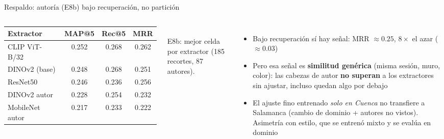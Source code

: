 \begin{frame}{Respaldo: autoría (E8b) bajo recuperación, no partición}
  \begin{columns}[c]
      \centering \scriptsize
      \setlength{\tabcolsep}{4pt}
      \begin{tabular}{lccc}
        \toprule
        \textbf{Extractor} & \textbf{MAP@5} & \textbf{Rec@5} & \textbf{MRR} \\
        \midrule
        CLIP ViT-B/32        & 0.252 & 0.268 & 0.262 \\
        DINOv2 (base)        & 0.248 & 0.268 & 0.251 \\
        ResNet50             & 0.246 & 0.236 & 0.256 \\
        \midrule
        DINOv2 autor         & 0.228 & 0.254 & 0.232 \\
        MobileNet autor      & 0.217 & 0.233 & 0.222 \\
        \bottomrule
      \end{tabular}\\[0.3em]
      {\scriptsize E8b: mejor celda por extractor (185 recortes, 87 autores).}
      \footnotesize
      \begin{itemize}
        \item Bajo recuperación sí hay señal: MRR $\approx 0.25$, $8\times$ el
            azar ($\approx 0.03$)
        \item Pero esa señal es \textbf{similitud genérica} (misma sesión,
            muro, color): las cabezas de autor \textbf{no superan} a los
            extractores sin ajustar, incluso quedan algo por debajo
        \item El ajuste fino entrenado \emph{solo en Cuenca} no transfiere a
            Salamanca (cambio de dominio + autores no vistos). Asimetría con
            estilo, que se entrenó mixto y se evalúa en dominio
      \end{itemize}
  \end{columns}
\end{frame}
